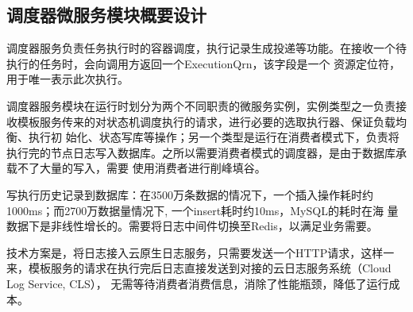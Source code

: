 \subsection{调度器微服务模块概要设计}
调度器服务负责任务执行时的容器调度，执行记录生成投递等功能。在接收一个待执行的任务时，会向调用方返回一个ExecutionQrn，该字段是一个
资源定位符，用于唯一表示此次执行。

调度器服务模块在运行时划分为两个不同职责的微服务实例，实例类型之一负责接收模板服务传来的对状态机调度执行的请求，进行必要的选取执行器、保证负载均衡、执行初
始化、状态写库等操作；另一个类型是运行在消费者模式下，负责将执行完的节点日志写入数据库。之所以需要消费者模式的调度器，是由于数据库承载不了大量的写入，需要
使用消费者进行削峰填谷。

写执行历史记录到数据库：在3500万条数据的情况下，一个插入操作耗时约1000ms；而2700万数据量情况下, 一个insert耗时约10ms，MySQL的耗时在海
量数据下是非线性增长的。需要将日志中间件切换至Redis，以满足业务需要。

技术方案是，将日志接入云原生日志服务，只需要发送一个HTTP请求，这样一来，模板服务的请求在执行完后日志直接发送到对接的云日志服务系统（Cloud Log Service, CLS），
无需等待消费者消费信息，消除了性能瓶颈，降低了运行成本。


